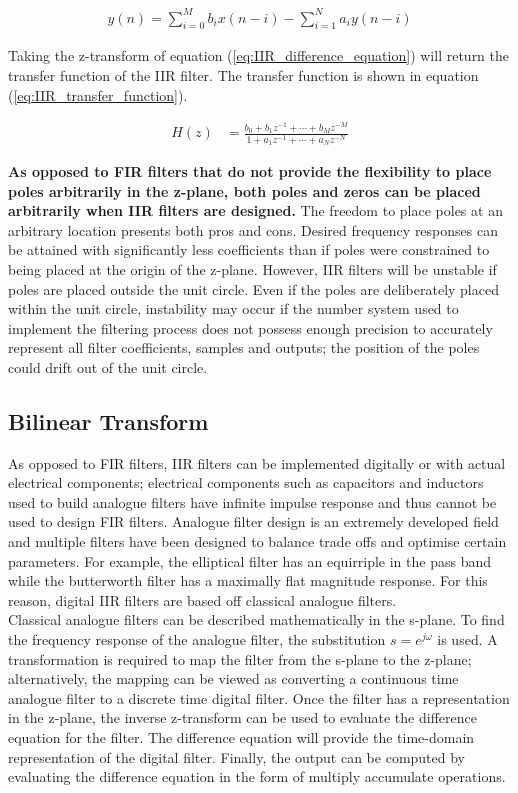 \documentclass{article}
\begin{document}
\begin{align}
    y(n) = \sum_{i=0}^{M}b_{i}x(n-i) - \sum_{i=1}^{N}a_{i}y(n-i) \label{eq:IIR_difference_equation}
\end{align}

Taking the z-transform of equation (\ref{eq:IIR_difference_equation}) will return the transfer function of the IIR filter. The transfer function is shown in equation (\ref{eq:IIR_transfer_function}).

\begin{align}
    H(z)    &= \frac{b_{0} + b_{1}z^{-1} + \cdots + b_{M}z^{-M}}{1+a_{1}z^{-1}+\cdots+a_{N}z^{-N}}\label{eq:IIR_transfer_function}
\end{align}

\textbf{As opposed to FIR filters that do not provide the flexibility to place poles arbitrarily in the z-plane, both poles and zeros can be placed arbitrarily when IIR filters are designed.} The freedom to place poles at an arbitrary location presents both pros and cons. Desired frequency responses can be attained with significantly less coefficients than if poles were constrained to being placed at the origin of the z-plane. However, IIR filters will be unstable if poles are placed outside the unit circle. Even if the poles are deliberately placed within the unit circle, instability may occur if the number system used to implement the filtering process does not possess enough precision to accurately represent all filter coefficients, samples and outputs; the position of the poles could drift out of the unit circle. 


\subsection{Bilinear Transform}\label{sec:bilinear_transform}
As opposed to FIR filters, IIR filters can be implemented digitally or with actual electrical components; electrical components such as capacitors and inductors used to build analogue filters have infinite impulse response and thus cannot be used to design FIR filters. Analogue filter design is an extremely developed field and multiple filters have been designed to balance trade offs and optimise certain parameters. For example, the elliptical filter has an equirriple in the pass band while the butterworth filter has a maximally flat magnitude response. For this reason, digital IIR filters are based off classical analogue filters. \\

Classical analogue filters can be described mathematically in the s-plane. To find the frequency response of the analogue filter, the substitution $s=e^{j\omega}$ is used. A transformation is required to map the filter from the s-plane to the z-plane; alternatively, the mapping can be viewed as converting a continuous time analogue filter to a discrete time digital filter. Once the filter has a representation in the z-plane, the inverse z-transform can be used to evaluate the difference equation for the filter. The difference equation will provide the time-domain representation of the digital filter. Finally, the output can be computed by evaluating the difference equation in the form of multiply accumulate operations.\\
\end{document}
